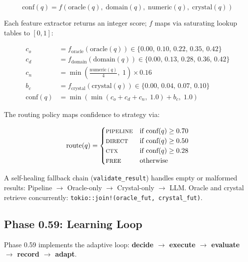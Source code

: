 \documentclass[12pt,a4paper]{article}
\begin{document}
\begin{equation}
\text{conf}(q) = f\!\left(\text{oracle}(q),\; \text{domain}(q),\; \text{numeric}(q),\; \text{crystal}(q)\right)
\end{equation}

Each feature extractor returns an integer score; $f$ maps via saturating
lookup tables to $[0,1]$:

\begin{align}
c_o &= f_{\text{oracle}}\!\left(\text{oracle}(q)\right) \in \{0.00,\, 0.10,\, 0.22,\, 0.35,\, 0.42\} \\
c_d &= f_{\text{domain}}\!\left(\text{domain}(q)\right) \in \{0.00,\, 0.13,\, 0.28,\, 0.36,\, 0.42\} \\
c_n &= \min\!\left(\tfrac{\text{numeric}(q)}{4},\; 1\right) \times 0.16 \\
b_c &= f_{\text{crystal}}\!\left(\text{crystal}(q)\right) \in \{0.00,\, 0.04,\, 0.07,\, 0.10\} \\
\text{conf}(q) &= \min\!\left(\min(c_o + c_d + c_n,\; 1.0) + b_c,\; 1.0\right)
\end{align}

The routing policy maps confidence to strategy via:

\begin{equation}
\text{route}(q) =
\begin{cases}
\textsc{pipeline} & \text{if } \text{conf}(q) \geq 0.70 \\
\textsc{direct}   & \text{if } \text{conf}(q) \geq 0.50 \\
\textsc{ctx}      & \text{if } \text{conf}(q) \geq 0.28 \\
\textsc{free}     & \text{otherwise}
\end{cases}
\label{eq:route}
\end{equation}

A self-healing fallback chain (\texttt{validate\_result}) handles empty or
malformed results: Pipeline $\to$ Oracle-only $\to$ Crystal-only $\to$ LLM.
Oracle and crystal retrieve concurrently: \texttt{tokio::join!(oracle\_fut, crystal\_fut)}.

\subsection{Phase 0.59: Learning Loop}

Phase 0.59 implements the adaptive loop: \textbf{decide $\to$ execute $\to$
evaluate $\to$ record $\to$ adapt}.
\end{document}
